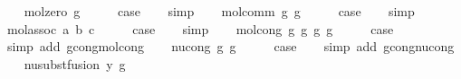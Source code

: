 \begin{isabellebody}
\ \ \isamarkupfalse%
\ {\isacharparenleft}{\kern0pt}mol{\isacharunderscore}{\kern0pt}zero\ g{\isacharparenright}{\kern0pt}\isanewline
\ \ \isamarkupfalse%
\ \isamarkupfalse%
\ {\isacharquery}{\kern0pt}case\isanewline
\ \ \isamarkupfalse%
\ simp\isanewline
{}\isamarkupfalse%
\isanewline
\ \ \isamarkupfalse%
\ {\isacharparenleft}{\kern0pt}mol{\isacharunderscore}{\kern0pt}comm\ g{}\ g{}{\isacharparenright}{\kern0pt}\isanewline
\ \ \isamarkupfalse%
\ \isamarkupfalse%
\ {\isacharquery}{\kern0pt}case\isanewline
\ \ \isamarkupfalse%
\ simp\isanewline
{}\isamarkupfalse%
\isanewline
\ \ \isamarkupfalse%
\ {\isacharparenleft}{\kern0pt}mol{\isacharunderscore}{\kern0pt}assoc\ a\ b\ c{\isacharparenright}{\kern0pt}\isanewline
\ \ \isamarkupfalse%
\ \isamarkupfalse%
\ {\isacharquery}{\kern0pt}case\isanewline
\ \ \isamarkupfalse%
\ simp\isanewline
{}\isamarkupfalse%
\isanewline
\ \ \isamarkupfalse%
\ {\isacharparenleft}{\kern0pt}mol{\isacharunderscore}{\kern0pt}cong\ g{}\ g{}{\isacharprime}{\kern0pt}\ g{}\ g{}{\isacharprime}{\kern0pt}{\isacharparenright}{\kern0pt}\isanewline
\ \ \isamarkupfalse%
\ \isamarkupfalse%
\ {\isacharquery}{\kern0pt}case\isanewline
\ \ \isamarkupfalse%
\ {\isacharparenleft}{\kern0pt}simp\ add{\isacharcolon}{\kern0pt}\ gcong{\isachardot}{\kern0pt}mol{\isacharunderscore}{\kern0pt}cong{\isacharparenright}{\kern0pt}\isanewline
{}\isamarkupfalse%
\isanewline
\ \ \isamarkupfalse%
\ {\isacharparenleft}{\kern0pt}nu{\isacharunderscore}{\kern0pt}cong\ g\ g{\isacharprime}{\kern0pt}{\isacharparenright}{\kern0pt}\isanewline
\ \ \isamarkupfalse%
\ \isamarkupfalse%
\ {\isacharquery}{\kern0pt}case\isanewline
\ \ \isamarkupfalse%
\ {\isacharparenleft}{\kern0pt}simp\ add{\isacharcolon}{\kern0pt}\ gcong{\isachardot}{\kern0pt}nu{\isacharunderscore}{\kern0pt}cong{\isacharparenright}{\kern0pt}\isanewline
{}\isamarkupfalse%
\isanewline
\ \ \isamarkupfalse%
\ {\isacharparenleft}{\kern0pt}nu{\isacharunderscore}{\kern0pt}subst{\isacharunderscore}{\kern0pt}fusion{}\ y\ g{\isacharparenright}{\kern0pt}\isanewline

\end{isabellebody}
